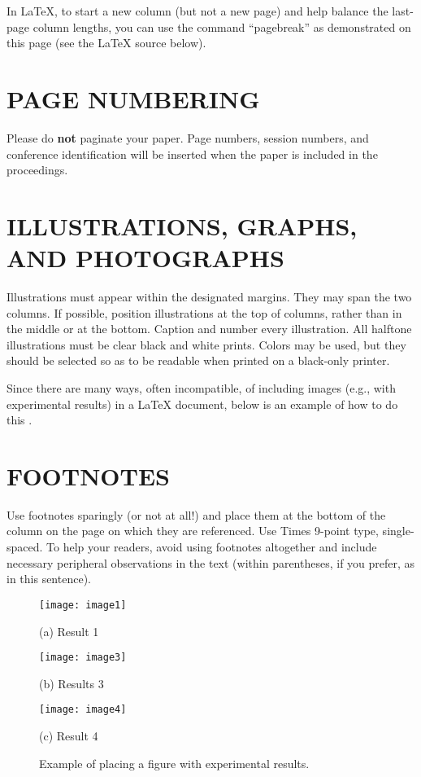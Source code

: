 \documentclass{article}
\begin{document}
In LaTeX, to start a new column (but not a new page) and help balance the
last-page column lengths, you can use the command ``pagebreak'' as
demonstrated on this page (see the LaTeX source below).

\section{PAGE NUMBERING}
\label{sec:page}

Please do {\bf not} paginate your paper. Page numbers, session numbers, and
conference identification will be inserted when the paper is included in the
proceedings.

\section{ILLUSTRATIONS, GRAPHS, AND PHOTOGRAPHS}
\label{sec:illust}

Illustrations must appear within the designated margins. They may span the two
columns. If possible, position illustrations at the top of columns, rather
than in the middle or at the bottom. Caption and number every illustration.
All halftone illustrations must be clear black and white prints. Colors may be
used, but they should be selected so as to be readable when printed on a
black-only printer.

Since there are many ways, often incompatible, of including images (e.g., with
experimental results) in a LaTeX document, below is an example of how to do
this \cite{Lamp86}.

\section{FOOTNOTES}
\label{sec:foot}

Use footnotes sparingly (or not at all!) and place them at the bottom of the
column on the page on which they are referenced. Use Times 9-point type,
single-spaced. To help your readers, avoid using footnotes altogether and
include necessary peripheral observations in the text (within parentheses, if
you prefer, as in this sentence).

\begin{figure}[htb]

\begin{minipage}[b]{1.0\linewidth}
 \centering
 \centerline{\texttt{[image: image1]}}
\centerline{(a) Result 1}\medskip
\end{minipage}
\begin{minipage}[b]{.48\linewidth}
 \centering
 \centerline{\texttt{[image: image3]}}
\centerline{(b) Results 3}\medskip
\end{minipage}
\hfill
\begin{minipage}[b]{0.48\linewidth}
 \centering
 \centerline{\texttt{[image: image4]}}
\centerline{(c) Result 4}\medskip
\end{minipage}
\caption{Example of placing a figure with experimental results.}
\label{fig:res}
\end{figure}
\end{document}

